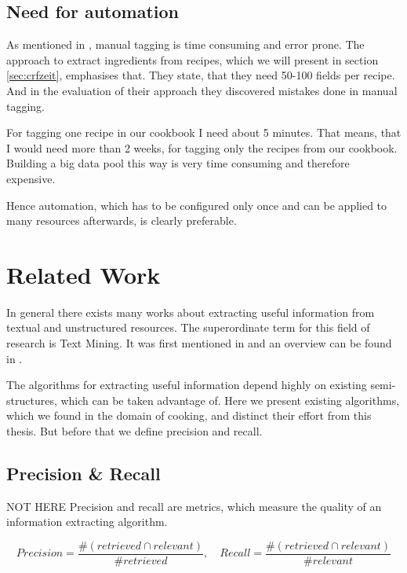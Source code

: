 \documentclass[12pt, twoside]{report}
\begin{document}
\section{Need for automation}\label{sec:NeedForAutomation}
As mentioned in \parencite{manualTagging}, manual tagging is time consuming and error prone. The approach to extract ingredients from recipes, which we will present in section \ref{sec:crfzeit}, emphasises that. They state, that they need 50-100 fields per recipe. And in the evaluation of their approach they discovered mistakes done in manual tagging.

For tagging one recipe in our cookbook I need about 5 minutes. That means, that I would need more than 2 weeks, for tagging only the recipes from our cookbook. Building a big data pool this way is very time consuming and therefore expensive.

Hence automation, which has to be configured only once and can be applied to many resources afterwards, is clearly preferable.



\chapter{Related Work}
In general there exists many works about extracting useful information from textual and unstructured resources. The superordinate term for this field of research is Text Mining. It was first mentioned in \parencite{KDT} and an overview can be found in \parencite{surveyOfTextMining}. 

The algorithms for extracting useful information depend highly on existing semi-structures, which can be taken advantage of. Here we present existing algorithms, which we found in the domain of cooking, and distinct their effort from this thesis. But before that we define precision and recall.

\section{Precision \& Recall}
NOT HERE
Precision and recall are metrics, which measure the quality of an information extracting algorithm.

\begin{equation} \label{eq:precisionAndRecall}
	Precision = \frac{\#(retrieved \cap relevant)}{\#retrieved}, \hspace{1em} Recall = \frac{\#(retrieved \cap relevant)}{\#relevant}
\end{equation}
\end{document}
